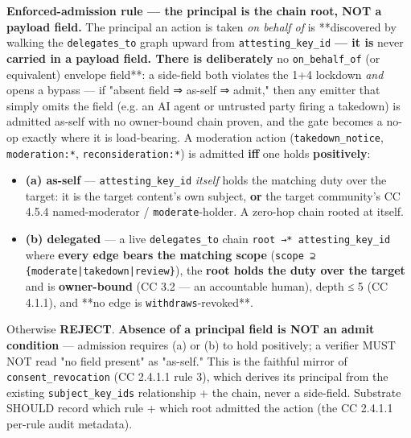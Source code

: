\documentclass[11pt]{article}
\begin{document}
\textbf{Enforced-admission rule — the principal is the chain root, NOT a payload field.} The principal an action is taken \textit{on behalf of} is **discovered by walking the \texttt{delegates\_to} graph upward from \texttt{attesting\_key\_id}\textbf{ — it is }never\textbf{ carried in a payload field. There is deliberately }no \texttt{on\_behalf\_of} (or equivalent) envelope field**: a side-field both violates the 1+4 lockdown \textit{and} opens a bypass — if "absent field ⇒ as-self ⇒ admit," then any emitter that simply omits the field (e.g. an AI agent or untrusted party firing a takedown) is admitted as-self with no owner-bound chain proven, and the gate becomes a no-op exactly where it is load-bearing. A moderation action (\texttt{takedown\_notice}, \texttt{moderation:*}, \texttt{reconsideration:*}) is admitted \textbf{iff} one holds \textbf{positively}:


\begin{itemize}\setlength\itemsep{0pt}
\item \textbf{(a) as-self} — \texttt{attesting\_key\_id} \textit{itself} holds the matching duty over the target: it is the target content's own subject, \textbf{or} the target community's CC 4.5.4 named-moderator / \texttt{moderate}-holder. A zero-hop chain rooted at itself.
\item \textbf{(b) delegated} — a live \texttt{delegates\_to} chain \texttt{root →* attesting\_key\_id} where \textbf{every edge bears the matching scope} (\texttt{scope ⊇ \{moderate|takedown|review\}}), the \textbf{root holds the duty over the target} and is \textbf{owner-bound} (CC 3.2 — an accountable human), depth ≤ 5 (CC 4.1.1), and **no edge is \texttt{withdraws}-revoked**.
\end{itemize}


Otherwise \textbf{REJECT}. \textbf{Absence of a principal field is NOT an admit condition} — admission requires (a) or (b) to hold positively; a verifier MUST NOT read "no field present" as "as-self." This is the faithful mirror of \texttt{consent\_revocation} (CC 2.4.1.1 rule 3), which derives its principal from the existing \texttt{subject\_key\_ids} relationship + the chain, never a side-field. Substrate SHOULD record which rule + which root admitted the action (the CC 2.4.1.1 per-rule audit metadata).
\end{document}
